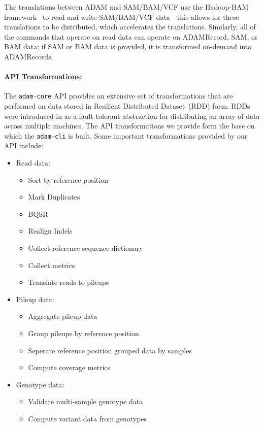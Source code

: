 \documentclass{bioinfo}
\begin{document}
The translations between ADAM and SAM/BAM/VCF use the Hadoop-BAM framework~\citep[see][]{niemenmaa12} to read and write SAM/BAM/VCF data---this allows for these
translations to be distributed, which accelerates the translations. Similarly, all of the commands that operate on read data can operate on ADAMRecord, SAM, or BAM data;
if SAM or BAM data is provided, it is transformed on-demand into ADAMRecords.

\paragraph{API Transformations:}
\label{sec:api-transforms}

The \texttt{adam-core} API provides an extensive set of transformations that are performed on data stored in Resilient Distributed Dataset~(RDD) form. RDDs were introduced
in \citet{zaharia12} as a fault-tolerant abstraction for distributing an array of data across multiple machines. The API transformations we provide form the base on which the
\texttt{adam-cli} is built. Some important transformations provided by our API include:

\begin{itemize}
\item Read data:
\begin{itemize}
\item Sort by reference position
\item Mark Duplicates
\item BQSR
\item Realign Indels
\item Collect reference sequence dictionary
\item Collect metrics
\item Translate reads to pileups
\end{itemize}
\item Pileup data:
\begin{itemize}
\item Aggregate pileup data
\item Group pileups by reference position
\item Seperate reference position grouped data by samples
\item Compute coverage metrics
\end{itemize}
\item Genotype data:
\begin{itemize}
\item Validate multi-sample genotype data
\item Compute variant data from genotypes
\end{itemize}
\end{itemize}
\end{document}
